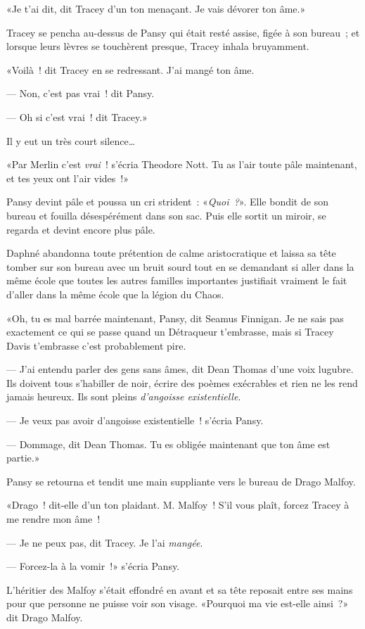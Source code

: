 «Je t'ai dit, dit Tracey d'un ton menaçant. Je vais dévorer ton âme.»

Tracey se pencha au-dessus de Pansy qui était resté assise, figée à son bureau~; et lorsque leurs lèvres se touchèrent presque, Tracey inhala bruyamment.

«Voilà~! dit Tracey en se redressant. J'ai mangé ton âme.

--- Non, c'est pas vrai~! dit Pansy.

--- Oh si c'est vrai~! dit Tracey.»

Il y eut un très court silence…

«Par Merlin c'est \emph{vrai}~! s'écria Theodore Nott. Tu as l'air toute pâle maintenant, et tes yeux ont l'air vides~!»

Pansy devint pâle et poussa un cri strident~: «\emph{Quoi~?}». Elle bondit de son bureau et fouilla désespérément dans son sac. Puis elle sortit un miroir, se regarda et devint encore plus pâle.

Daphné abandonna toute prétention de calme aristocratique et laissa sa tête tomber sur son bureau avec un bruit sourd tout en se demandant si aller dans la même école que toutes les autres familles importantes justifiait vraiment le fait d'aller dans la même école que la légion du Chaos.

«Oh, tu es mal barrée maintenant, Pansy, dit Seamus Finnigan. Je ne sais pas exactement ce qui se passe quand un Détraqueur t'embrasse, mais si Tracey Davis t'embrasse c'est probablement pire.

--- J'ai entendu parler des gens sans âmes, dit Dean Thomas d'une voix lugubre. Ils doivent tous s'habiller de noir, écrire des poèmes exécrables et rien ne les rend jamais heureux. Ils sont pleins \emph{d'angoisse existentielle}.

--- Je veux pas avoir d'angoisse existentielle~! s'écria Pansy.

--- Dommage, dit Dean Thomas. Tu es obligée maintenant que ton âme est partie.»

Pansy se retourna et tendit une main suppliante vers le bureau de Drago Malfoy.

«Drago~! dit-elle d'un ton plaidant. M. Malfoy~! S'il vous plaît, forcez Tracey à me rendre mon âme~!

--- Je ne peux pas, dit Tracey. Je l'ai \emph{mangée}.

--- Forcez-la à la vomir~!» s'écria Pansy.

L'héritier des Malfoy s'était effondré en avant et sa tête reposait entre ses mains pour que personne ne puisse voir son visage. «Pourquoi ma vie est-elle ainsi~?» dit Drago Malfoy.

